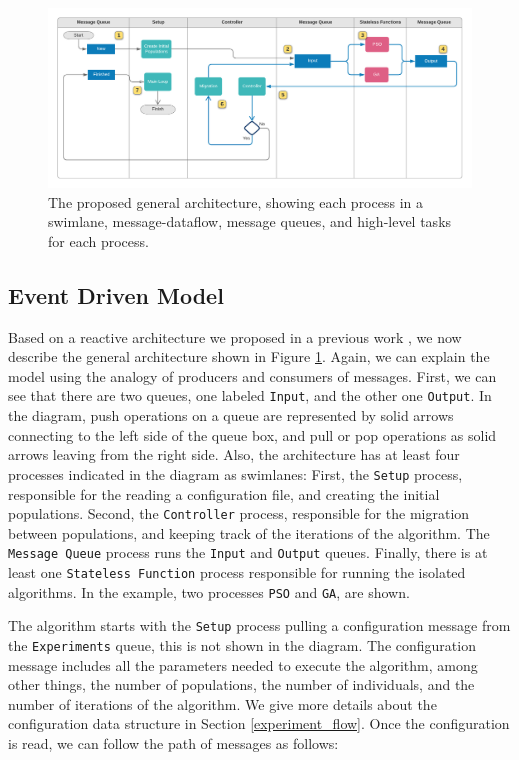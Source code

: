 \documentclass[review]{elsarticle}
\begin{document}
\begin{figure}
    \centering
    \includegraphics[width=\textwidth]{KafkEOsmall}
    \caption{The proposed general architecture, 
     showing each process in a swimlane, message-dataflow,
     message queues, and high-level tasks for each process.} 
    \label{fig:kafkEO}
\end{figure}

\subsection{Event Driven Model} 
\label{edm}
Based on a reactive architecture we proposed in a previous work
\cite{guervos2018introducing}, we now describe the general architecture shown in
Figure \ref{fig:kafkEO}. Again, we can explain the model using the analogy
of producers and consumers of messages. First, we can see that
there are two queues, one labeled \texttt{Input}, and the other one \texttt{Output}. In the diagram, 
push operations on a queue are represented by solid arrows connecting to the left side
of the queue box, and pull or pop operations as solid arrows leaving from the right side.
Also, the architecture has at least four processes indicated in the diagram as
swimlanes: First, the \texttt{Setup} process, responsible for the reading a configuration
file, and creating the initial populations. Second, the \texttt{Controller} process,
responsible for the migration between populations, and keeping track of the
iterations of the algorithm. The \texttt{Message Queue} process runs the \texttt{Input} and \texttt{Output}
queues. Finally, there is at least one \texttt{Stateless Function} process responsible
for running the isolated algorithms. In the example, two processes \texttt{PSO} and \texttt{GA},
are shown. 

The algorithm starts with the \texttt{Setup} process pulling a configuration message from
the \texttt{Experiments} queue, this is not shown in the diagram. The configuration message 
includes all the parameters needed to execute the algorithm, among other things,
the number of populations, the number of individuals, and the number of iterations
of the algorithm. We give more details about the configuration data structure
in Section \ref{experiment_flow}. %
Once the configuration is read, we can follow the path of 
messages as follows:
\end{document}
